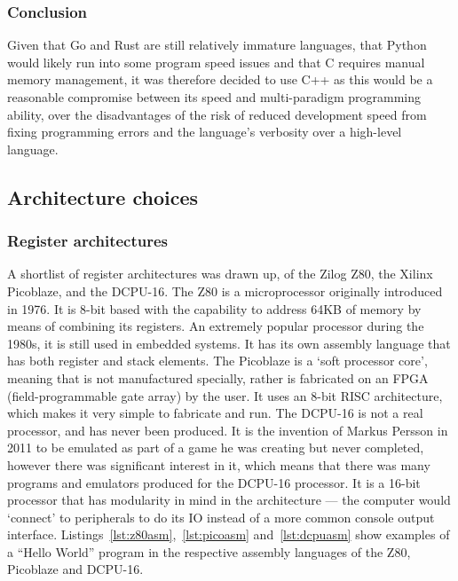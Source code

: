 \subsubsection{Conclusion}
Given that Go and Rust are still relatively immature languages, that Python
would likely run into some program speed issues and that C requires manual
memory management, it was therefore decided to use C++ as this would be a
reasonable compromise between its speed and multi-paradigm programming ability,
over the disadvantages of the risk of reduced development speed from fixing
programming errors and the language's verbosity over a high-level language.

\subsection{Architecture choices}

\subsubsection{Register architectures}

A shortlist of register architectures was drawn up, of the Zilog Z80, the Xilinx
Picoblaze, and the DCPU-16. The Z80 is a microprocessor originally introduced in
1976. It is 8-bit based with the capability to address 64KB of memory by means
of combining its registers. An extremely popular processor during the 1980s, it
is still used in embedded systems. It has its own assembly language that has
both register and stack elements. The Picoblaze is a `soft processor core',
meaning that is not manufactured specially, rather is fabricated on an FPGA
(field-programmable gate array) by the user. It uses an 8-bit RISC architecture,
which makes it very simple to fabricate and run. The DCPU-16 is not a real
processor, and has never been produced. It is the invention of Markus Persson in
2011 to be emulated as part of a game he was creating but never completed,
however there was significant interest in it, which means that there was many
programs and emulators produced for the DCPU-16 processor. It is a 16-bit
processor that has modularity in mind in the architecture --- the computer would
`connect' to peripherals to do its IO instead of a more common console output
interface.  Listings~\ref{lst:z80asm},~\ref{lst:picoasm} and~\ref{lst:dcpuasm}
show examples of a ``Hello World'' program in the respective assembly languages
of the Z80, Picoblaze and DCPU-16.

